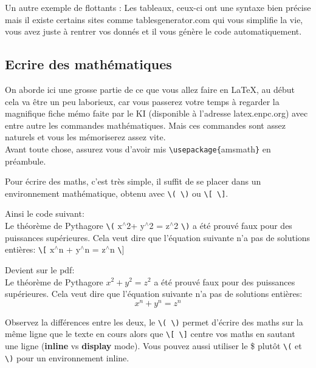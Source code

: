 \documentclass[11pt]{article}				%
\newcommand{\tb}{\textbackslash}
\newcommand{\cmd}[2]{\texttt{\textbackslash #1}\texttt{\{}#2\texttt{\}}}
\begin{document}
Un autre exemple de flottants : Les tableaux, ceux-ci ont une syntaxe bien précise mais il existe certains sites comme tablesgenerator.com qui vous simplifie la vie, vous avez juste à rentrer vos donnés et il vous génère le code automatiquement.

\clearpage

\subsection{Ecrire des mathématiques}

On aborde ici une grosse partie de ce que vous allez faire en LaTeX, au début cela va être un peu laborieux, car vous passerez votre temps à regarder la magnifique fiche mémo faite par le KI (disponible à l'adresse latex.enpc.org) avec entre autre les commandes mathématiques. Mais ces commandes sont assez naturels et vous les mémoriserez assez vite.\\

Avant toute chose, assurez vous d'avoir mis \cmd{usepackage}{amsmath} en préambule.

Pour écrire des maths, c'est très simple, il suffit de se placer dans un environnement mathématique, obtenu avec \texttt{\tb( \tb)} ou \texttt{\tb[ \tb]}. 

\begin{multicols}{2}
Ainsi le code suivant:\\
\textsf{Le théorème de Pythagore \texttt{\tb(} $\text{x}^{\wedge}$2+ $\text{y}^{\wedge}$2 = $\text{z}^{\wedge}$2 \texttt{\tb)} a été prouvé faux pour des puissances supérieures. Cela veut dire que l'équation suivante n'a pas de solutions entières:
	 \texttt{\tb[} $\text{x}^{\wedge}$n + $\text{y}^{\wedge}$n = $\text{z}^{\wedge}$n \texttt{\tb}] }
	
	\columnbreak
	
	Devient sur le pdf:\\	
	Le théorème de Pythagore $x^2 + y^2 = z^2$ a été prouvé faux pour des puissances supérieures. Cela veut dire que l'équation suivante n'a pas de solutions entières: \[ x^n + y^n = z^n \]
	
	
	
\end{multicols}
Observez la différences entre les deux, le \texttt{\tb( \tb)} permet d'écrire des maths sur la même ligne que le texte en cours alors que \texttt{\tb[ \tb]} centre vos maths en sautant une ligne (\textbf{inline} vs \textbf{display} mode). Vous pouvez aussi utiliser le \$ plutôt \texttt{\tb(} et \texttt{\tb)} pour un environnement inline.
\end{document}
